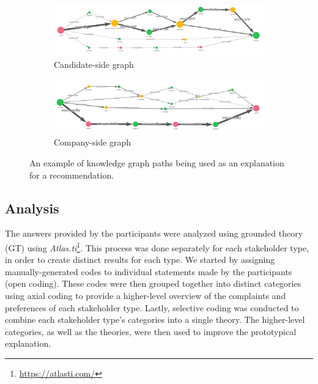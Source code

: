 \begin{figure}[th]
    \begin{subfigure}[b]{1\linewidth}
         \centering
         \includegraphics[width=\textwidth]{images/graph_candidate.png}
         \caption{Candidate-side graph}
         \label{fig:cand_side}
     \end{subfigure}
     \hfill
     \begin{subfigure}[b]{\linewidth}
         \centering
         \includegraphics[width=\textwidth]{images/graph_company.png}
         \caption{Company-side graph}
         \label{fig:comp_side}
     \end{subfigure}
    \caption{An example of knowledge graph paths being used as an explanation for a recommendation.}
    \label{fig:paths}
\end{figure}



\subsection{Analysis}
The answers provided by the participants were analyzed using grounded theory (GT) \cite{walker2006grounded} using \textit{Atlas.ti}\footnote{\url{https://atlasti.com/}}. This process was done separately for each stakeholder type, in order to create distinct results for each type. We started by assigning manually-generated codes to individual statements made by the participants (open coding). These codes were then grouped together into distinct categories using axial coding to provide a higher-level overview of the complaints and preferences of each stakeholder type. Lastly, selective coding was conducted to combine each stakeholder type's categories into a single theory. The higher-level categories, as well as the theories, were then used to improve the prototypical explanation. 

